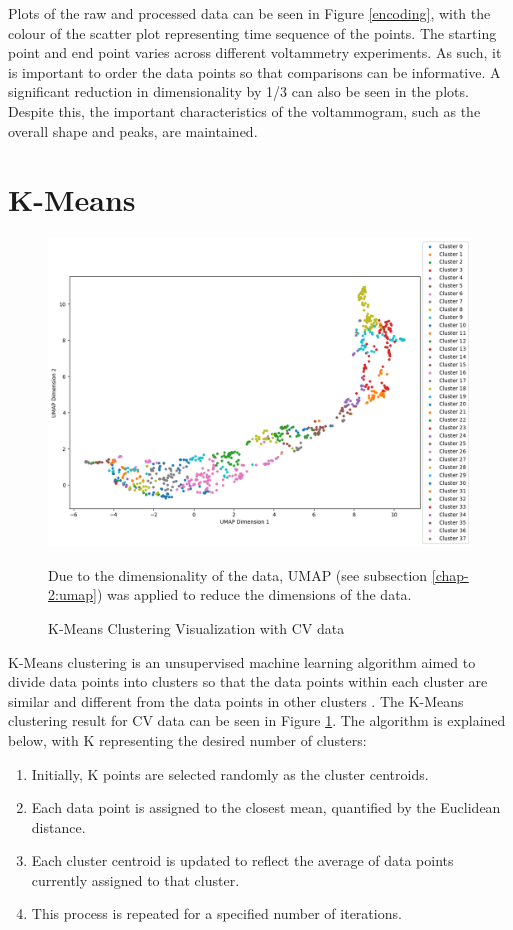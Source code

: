 Plots of the raw and processed data can be seen in Figure \ref{encoding}, with the colour of the scatter plot representing time sequence of the points. The starting point and end point varies across different voltammetry experiments. As such, it is important to order the data points so that comparisons can be informative. A significant reduction in dimensionality by 1/3 can also be seen in the plots. Despite this, the important characteristics of the voltammogram, such as the overall shape and peaks, are maintained.
\section{K-Means}
\begin{figure}[!h]
  \centering
    \includegraphics[width=1.0\textwidth]{figures/k-means.png}
    \caption{K-Means Clustering Visualization with CV data}
    \label{kmeans}
    Due to the dimensionality of the data, UMAP (see subsection \ref{chap-2:umap}) was applied to reduce the dimensions of the data.
\end{figure}
K-Means clustering is an unsupervised machine learning algorithm aimed to divide data points into clusters so that the data points within each cluster are similar and different from the data points in other clusters \cite{MacQueen1967}. The K-Means clustering result for CV data can be seen in Figure \ref{kmeans}. The algorithm is explained below, with K representing the desired number of clusters:
\begin{enumerate}
    \item Initially, K points are selected randomly as the cluster centroids.
    \item Each data point is assigned to the closest mean, quantified by the Euclidean distance. 
    \item Each cluster centroid is updated to reflect the average of data points currently assigned to that cluster.
    \item This process is repeated for a specified number of iterations.
\end{enumerate}
